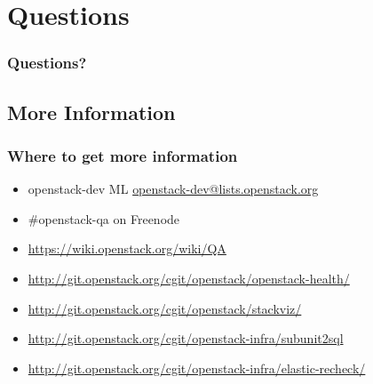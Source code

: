 \documentclass[aspectratio=169,11pt,hyperref={colorlinks=true}]{beamer}
\begin{document}
\section{Questions}
\begin{frame}
  \frametitle{Questions?}
\end{frame}

\subsection{More Information}
\begin{frame}
\frametitle{Where to get more information}
  \begin{itemize}
    \item openstack-dev ML\: \href{mailto:openstack-dev@lists.openstack.org}{openstack-dev@lists.openstack.org}
    \item \#openstack-qa on Freenode
    \item \url{https://wiki.openstack.org/wiki/QA}
    \item \url{http://git.openstack.org/cgit/openstack/openstack-health/}
    \item \url{http://git.openstack.org/cgit/openstack/stackviz/}
    \item \url{http://git.openstack.org/cgit/openstack-infra/subunit2sql}
    \item \url{http://git.openstack.org/cgit/openstack-infra/elastic-recheck/}
  \end{itemize}
\end{frame}

\end{document}
